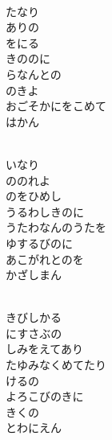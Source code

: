 \documentclass[10pt,b5j]{tarticle} %
\begin{document}
\vspace{1.5em} %
\newcommand{\linespace}{0.5em} %
\newcommand{\blocksize}{0.5\hsize} %
\newcommand{\itemmargin}{6em} %
\begin{enumerate} %
    \setlength{\itemindent}{\itemmargin} %
    \begin{minipage}[c]{\blocksize}
    
        \vspace{\linespace}
        \item~\\
        たなり\\
        ありの\\
        をにる\\
        きののに\\
        らなんとの\\
        のきよ\\
        おごそかにをこめて\\
        はかん
        
        \vspace{\linespace}
        \item~\\
        いなり\\
        ののれよ\\
        のをひめし\\
        うるわしきのに\\
        うたわなんのうたを\\
        ゆするびのに\\
        あこがれとのを\\
        かざしまん
        
        \vspace{\linespace}
        \item~\\
        きびしかる\\
        にすさぶの\\
        しみをえてあり\\
        たゆみなくめてたり\\
        けるの\\
        よろこびのきに\\
        きくの\\
        とわにえん
    
    \end{minipage}
\end{enumerate} %
\end{document}
